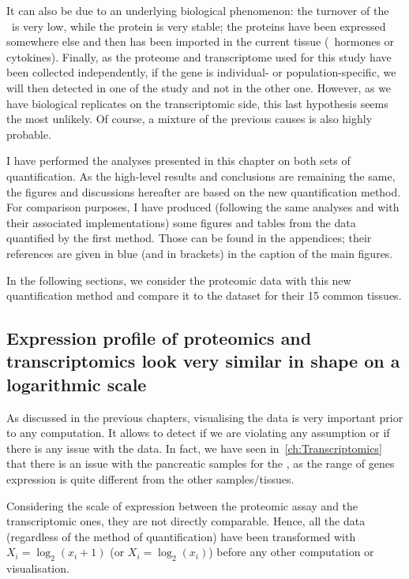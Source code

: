 It can also be due to an underlying biological phenomenon:
the turnover of the \mRNA\ is very low, while the protein is very stable;
the proteins have been expressed somewhere else and then has been imported in the
current tissue (\eg\ hormones or cytokines). Finally, as the proteome
and transcriptome used for this study have been collected independently, if the
gene is individual- or population-specific, we will then detected in one of the
study and not in the other one. However, as we have biological replicates on the
transcriptomic side, this last hypothesis seems the most unlikely.
Of course, a mixture of the previous causes is also highly probable.

I have performed the analyses presented in this chapter on both sets of
quantification. As the high-level results and conclusions are remaining the same,
the figures and discussions hereafter are based on
the new quantification method. For comparison purposes,
I have produced (following the same analyses and with their associated
implementations) some figures and tables from the data quantified by the first
method. Those can be found in the appendices; their references
are given in blue (and in brackets) in the caption of the main figures.

In the following sections, we consider the proteomic data with this new
quantification method and compare it to the  dataset
for their 15 common tissues.

\subsection{Expression profile of proteomics and transcriptomics look very
similar in shape on a logarithmic scale}
\label{subsec:IntegrationExpProfileSim}

As discussed in the previous chapters, visualising the data is very important
prior to any computation. It allows to detect if we are violating
any assumption or if there is any issue with the data. In fact, we have seen
in~\cref{ch:Transcriptomics} that there is an issue with the pancreatic
samples for the , as the range of genes expression is quite
different from the other samples/tissues.

Considering the scale of expression between the proteomic assay and the
transcriptomic ones, they are not directly comparable. Hence,
all the data (regardless of the method of quantification) have been transformed
with $X_{i}=\log_{2} (x_{i}+1)$ (or $X_{i}=\log_{2} (x_{i})$)
before any other computation or visualisation.


